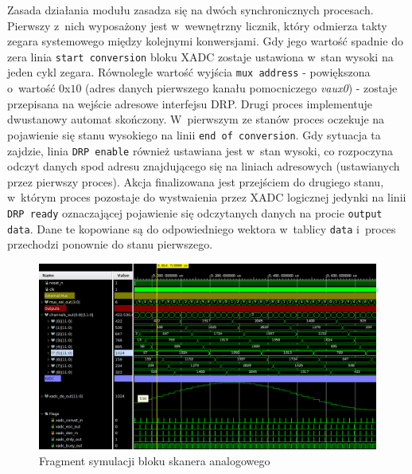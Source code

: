 Zasada działania modułu zasadza się na dwóch synchronicznych procesach. Pierwszy z~nich wyposażony jest w~wewnętrzny licznik, który odmierza takty zegara systemowego między kolejnymi konwersjami. Gdy jego wartość spadnie do zera linia \verb|start conversion| bloku XADC zostaje ustawiona w~stan wysoki na jeden cykl zegara. Równolegle wartość wyjścia \verb|mux address| - powiększona o~wartość $0$x$10$ (adres danych pierwszego kanału pomocniczego \textit{vaux0}) - zostaje przepisana na wejście adresowe interfejsu DRP. Drugi proces implementuje dwustanowy automat skończony. W~pierwszym ze stanów proces oczekuje na pojawienie się stanu wysokiego na linii \verb|end of conversion|. Gdy sytuacja ta zajdzie, linia \verb|DRP enable| również ustawiana jest w~stan wysoki, co rozpoczyna odczyt danych spod adresu znajdującego się na liniach adresowych (ustawianych przez pierwszy proces). Akcja finalizowana jest przejściem do drugiego stanu, w~którym proces pozostaje do wystwaienia przez XADC logicznej jedynki na linii \verb|DRP ready| oznaczającej pojawienie się odczytanych danych na procie \verb|output data|. Dane te kopowiane są do odpowiedniego wektora w~tablicy \verb|data| i~proces przechodzi ponownie do stanu pierwszego.

\vspace{0.5cm}
\begin{figure}[ht]
    \centering
    \includegraphics[width=\textwidth]{img/sim/analog_scanner_sim.png}
    \captionsetup{format=plain,justification=centering}
    \caption{Fragment symulacji bloku skanera analogowego}
    \label{sim-analog-scanner}
\end{figure}
\vspace{0.5cm}

